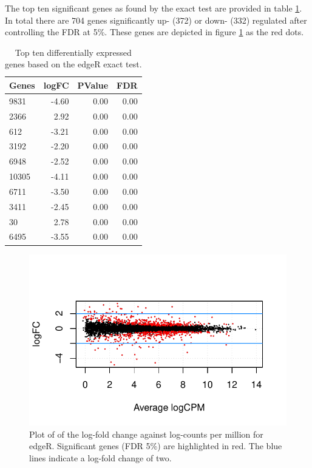 \documentclass[a4paper,10pt]{article}\usepackage[]{graphicx}\usepackage[]{color}
\makeatletter
\def\maxwidth{ %
  \ifdim\Gin@nat@width>\linewidth
    \linewidth
  \else
    \Gin@nat@width
  \fi
}
\newenvironment{knitrout}{}{} %
\makeatother
\begin{document}
The top ten significant genes as found by the exact test are provided in table \ref{edgeR-top}. In total there are 704 genes significantly up- (372) or down- (332) regulated after controlling the FDR at 5\%. These genes are depicted in figure \ref{edgeR-de-genes} as the red dots. 

\begin{table}[H]
\centering
\caption{Top ten differentially expressed genes
                            based on the edgeR exact test.} 
\label{edgeR-top}
\begin{tabular}{lrrr}
  \hline
Genes & logFC & PValue & FDR \\ 
  \hline
9831 & -4.60 & 0.00 & 0.00 \\ 
  2366 & 2.92 & 0.00 & 0.00 \\ 
  612 & -3.21 & 0.00 & 0.00 \\ 
  3192 & -2.20 & 0.00 & 0.00 \\ 
  6948 & -2.52 & 0.00 & 0.00 \\ 
  10305 & -4.11 & 0.00 & 0.00 \\ 
  6711 & -3.50 & 0.00 & 0.00 \\ 
  3411 & -2.45 & 0.00 & 0.00 \\ 
  30 & 2.78 & 0.00 & 0.00 \\ 
  6495 & -3.55 & 0.00 & 0.00 \\ 
   \hline
\end{tabular}
\end{table}


\begin{figure}[H]
  \centering
\begin{knitrout}
\color{fgcolor}

{\centering \includegraphics[width=\maxwidth]{figures/plots-edgeR-de-plot-1} 

}



\end{knitrout}
\caption{Plot of of the log-fold change against log-counts per million for edgeR. Significant genes (FDR 5\%) are highlighted in red. The blue lines indicate a log-fold change of two.}
\label{edgeR-de-genes}
\end{figure}
\end{document}
